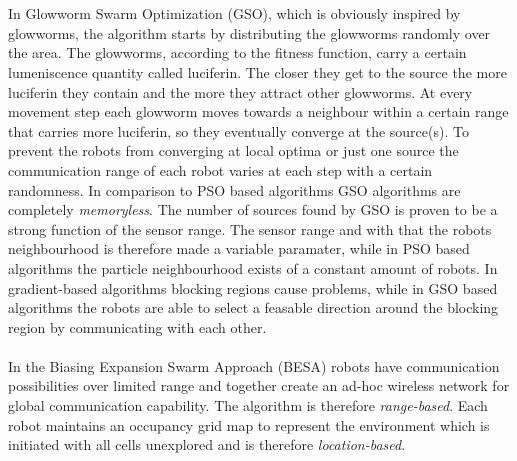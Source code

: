 		\\ \\
		In Glowworm Swarm Optimization (GSO), which is obviously inspired by glowworms, the algorithm starts by distributing the glowworms randomly over the area.
		The glowworms, according to the fitness function, carry a certain lumeniscence quantity called luciferin. 
		The closer they get to the source the more luciferin they contain and the more they attract other glowworms. 
		At every movement step each glowworm moves towards a neighbour within a certain range that carries more luciferin, so they eventually converge at the source(s). 
		To prevent the robots from converging at local optima or just one source the communication range of each robot varies at each step with a certain randomness.
		In comparison to PSO based algorithms GSO algorithms are completely \emph{memoryless}.
		The number of sources found by GSO is proven to be a strong function of the sensor range.
		The sensor range and with that the robots neighbourhood is therefore made a variable paramater, while in PSO based algorithms the particle neighbourhood exists of a constant amount of robots.
		In gradient-based algorithms blocking regions cause problems, while in GSO based algorithms the robots are able to select a feasable direction around the blocking region by communicating with each other. \cite{krishnanand2005detection}
		\\ \\
		In the Biasing Expansion Swarm Approach (BESA) robots have communication possibilities over limited range and together create an ad-hoc wireless network for global communication capability.
		The algorithm is therefore \emph{range-based}.
		Each robot maintains an occupancy grid map to represent the environment which is initiated with all cells unexplored and is therefore \emph{location-based}.
